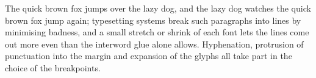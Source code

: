 \documentclass{article}
\begin{document}
The quick brown fox jumps over the lazy dog, and the lazy dog watches the quick brown fox
jump again; typesetting systems break such paragraphs into lines by minimising badness,
and a small stretch or shrink of each font lets the lines come out more even than the
interword glue alone allows. Hyphenation, protrusion of punctuation into the margin and
expansion of the glyphs all take part in the choice of the breakpoints.
\end{document}
